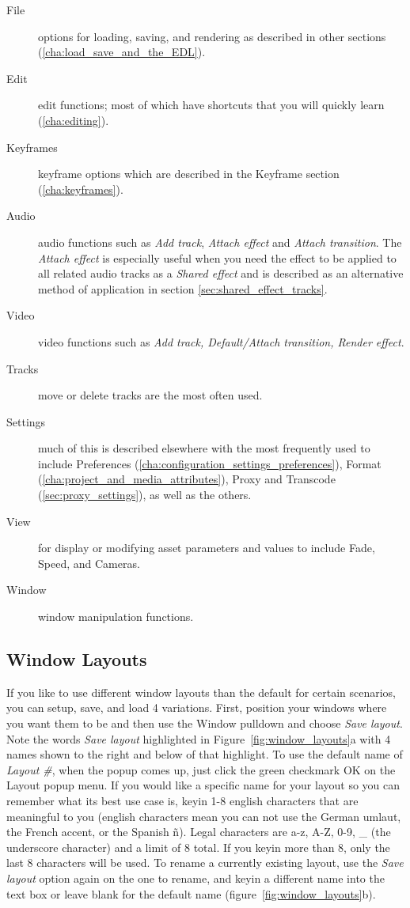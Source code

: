 \begin{description}
    \item[File]  options for loading, saving, and rendering as described in other sections (\ref{cha:load_save_and_the_EDL}).
    \item[Edit]  edit functions; most of which have shortcuts that you will quickly learn (\ref{cha:editing}).
    \item[Keyframes]  keyframe options which are described in the Keyframe section (\ref{cha:keyframes}).
    \item[Audio]  audio functions such as \textit{Add track}, \textit{Attach effect}
and \textit{Attach transition}.  The \textit{Attach effect} is especially useful when
you need the effect to be applied to all related audio tracks as a \textit{Shared effect}
and is described as an alternative method of application in section \ref{sec:shared_effect_tracks}.
    \item[Video]  video functions such as \textit{Add track, Default/Attach transition, Render effect}.
    \item[Tracks]  move or delete tracks are the most often used.
    \item[Settings]  much of this is described elsewhere with the most frequently used to include
Preferences (\ref{cha:configuration_settings_preferences}), Format (\ref{cha:project_and_media_attributes}), 
Proxy and Transcode (\ref{sec:proxy_settings}), as well as the others.
    \item[View]  for display or modifying asset parameters and values to include Fade, Speed, and Cameras.
    \item[Window]  window manipulation functions.
\end{description}


\subsection{Window Layouts}%
\label{sub:window_layouts}

If you like to use different window layouts than the default for certain scenarios, you can setup, save, and load 4 variations.   
First, position your \CGG{} windows where you want them to be and then use the Window pulldown and choose \emph{Save layout}. Note the words \emph{Save layout} highlighted in Figure~\ref{fig:window_layouts}a with 4 names shown to the right and below of that highlight. 
To use the default name of \textit{Layout \#}, when the popup comes up, just click the green checkmark OK on the Layout popup menu.  
If you would like a specific name for your layout so you can remember what its best use case is,
keyin 1-8 english characters that are meaningful to you (english characters mean you can not use the German umlaut, the French accent, or the Spanish ñ). 
Legal characters are a-z, A-Z, 0-9, \_ (the underscore character) and a limit of 8 total.  
If you keyin more than 8, only the last 8 characters will be used.  
To rename a currently existing layout, use the \emph{Save layout} option again on the one to rename, and keyin a different name into the text box or leave blank for the default name (figure~\ref{fig:window_layouts}b).

